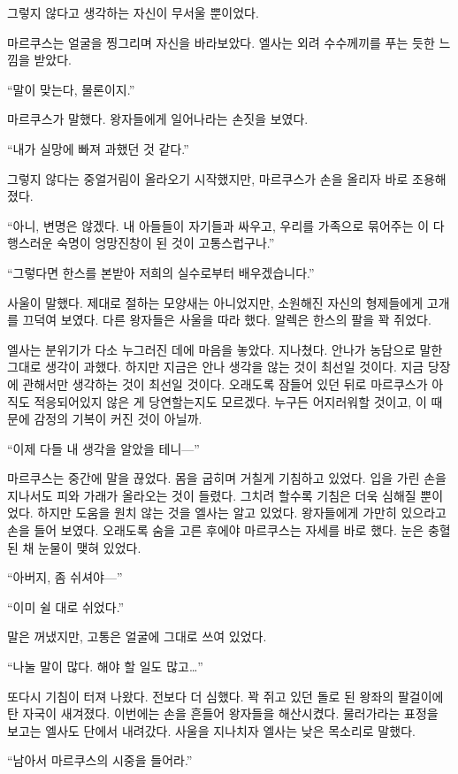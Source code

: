 그렇지 않다고 생각하는 자신이 무서울 뿐이었다.

마르쿠스는 얼굴을 찡그리며 자신을 바라보았다. 엘사는 외려 수수께끼를 푸는 듯한 느낌을 받았다.

`` 말이 맞는다, 물론이지.''

마르쿠스가 말했다. 왕자들에게 일어나라는 손짓을 보였다.

``내가 실망에 빠져 과했던 것 같다.''

그렇지 않다는 중얼거림이 올라오기 시작했지만, 마르쿠스가 손을 올리자 바로 조용해졌다.

``아니, 변명은 않겠다. 내 아들들이 자기들과 싸우고, 우리를 가족으로 묶어주는 이 다행스러운 숙명이 엉망진창이 된 것이 고통스럽구나.''

``그렇다면 한스를 본받아 저희의 실수로부터 배우겠습니다.''

사울이 말했다. 제대로 절하는 모양새는 아니었지만, 소원해진 자신의 형제들에게 고개를 끄덕여 보였다. 다른 왕자들은 사울을 따라 했다. 알렉은 한스의 팔을 꽉 쥐었다.

엘사는 분위기가 다소 누그러진 데에 마음을 놓았다. 지나쳤다. 안나가 농담으로 말한 그대로 생각이 과했다. 하지만 지금은 안나 생각을 않는 것이 최선일 것이다. 지금 당장에 관해서만 생각하는 것이 최선일 것이다. 오래도록 잠들어 있던 뒤로 마르쿠스가 아직도 적응되어있지 않은 게 당연할는지도 모르겠다. 누구든 어지러워할 것이고, 이 때문에 감정의 기복이 커진 것이 아닐까.

``이제 다들 내 생각을 알았을 테니—''

마르쿠스는 중간에 말을 끊었다. 몸을 굽히며 거칠게 기침하고 있었다. 입을 가린 손을 지나서도 피와 가래가 올라오는 것이 들렸다. 그치려 할수록 기침은 더욱 심해질 뿐이었다. 하지만 도움을 원치 않는 것을 엘사는 알고 있었다. 왕자들에게 가만히 있으라고 손을 들어 보였다. 오래도록 숨을 고른 후에야 마르쿠스는 자세를 바로 했다. 눈은 충혈된 채 눈물이 맺혀 있었다.

``아버지, 좀 쉬셔야—''

``이미 쉴 대로 쉬었다.''

말은 꺼냈지만, 고통은 얼굴에 그대로 쓰여 있었다.

``나눌 말이 많다. 해야 할 일도 많고\ldots''

또다시 기침이 터져 나왔다. 전보다 더 심했다. 꽉 쥐고 있던 돌로 된 왕좌의 팔걸이에 탄 자국이 새겨졌다. 이번에는 손을 흔들어 왕자들을 해산시켰다. 물러가라는 표정을 보고는 엘사도 단에서 내려갔다. 사울을 지나치자 엘사는 낮은 목소리로 말했다.

``남아서 마르쿠스의 시중을 들어라.''

